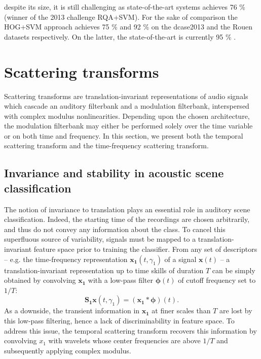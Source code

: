 \documentclass[journal]{IEEEtran}
\makeatletter
\newcommand*{\eg}{e.g.\@\xspace}
\makeatother
\begin{document}
despite its size, it is still challenging as state-of-the-art systems achieves 76 \% \cite{6701890} (winner of the 2013 challenge RQA+SVM). For the sake of comparison the HOG+SVM approach \cite{rakotomamonjy2015histogram} achieves 75 \% and 92 \% on the dcase2013 and the Rouen datasets respectively. On the latter, the state-of-the-art is currently 95 \% \cite{bisot2016acoustic}.

\section{Scattering transforms}
Scattering transforms are translation-invariant representations of audio signals which cascade an auditory filterbank and a modulation filterbank, interspersed with complex modulus nonlinearities.
Depending upon the chosen architecture, the modulation filterbank may either be performed solely over the time variable or on both time and frequency.
In this section, we present both the temporal scattering transform and the time-frequency scattering transform.

\subsection{Invariance and stability in acoustic scene classification}
The notion of invariance to translation plays an essential role in auditory scene classification.
Indeed, the starting time of the recordings are chosen arbitrarily, and thus do not convey any information about the class.
To cancel this superfluous source of variability, signals must be mapped to a translation-invariant feature space prior to training the classifier.
From any set of descriptors -- \eg the time-frequency representation $\boldsymbol{x_1}(t,\gamma_1)$ of  a signal $\boldsymbol{x}(t)$ --
a translation-invariant representation up to time skills of duration $T$ can be simply obtained
by convolving $\boldsymbol{x_1}$ with a low-pass filter $\boldsymbol{\phi}(t)$ of cutoff frequency
set to $1/T$:
\begin{equation}
\mathbf{S_1}\boldsymbol{x}(t, \gamma_1) = (\boldsymbol{x_1} \ast \boldsymbol{\phi}) (t).
\end{equation}
As a downside, the transient information in $\boldsymbol{x_1}$ at finer scales than $T$ are lost by this low-pass filtering, hence a lack of discriminability in feature space.
To address this issue, the temporal scattering transform recovers this information by convolving $x_1$ with wavelets whose center frequencies are above $1/T$ and subsequently applying complex modulus.
\end{document}
